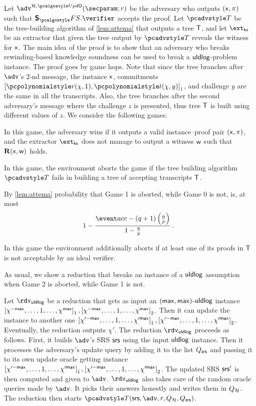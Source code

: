 Let $\adv^{\ro, \initU}(\secparam; r)$ be the adversary who outputs $(\mathsf{x}, \pi)$ such that $\sonicprotfs.\verifier$ accepts the proof. Let $\tdv$ be the tree-building algorithm of \cref{lem:attema} that outputs a tree $\mathsf{T}$, and let $\extcss$ be an extractor that given the tree output by $\tdv$ reveals the witness for $\mathsf{x}$. The main idea of the proof is to show that an adversary who breaks rewinding-based knowledge soundness can be used to break a $\mathsf{uldlog}$-problem instance. The proof goes by game hops. Note that since the tree branches after $\adv$'s $2$-nd message, the instance $\mathsf{x}$, commitments $\gone{\p{r} (\chi, 1), \p{t} (\chi, y)}$, and challenge $y$ are the same in all the transcripts. Also, the tree branches after the second adversary's message where the challenge $z$ is presented, thus tree $\mathsf{T}$ is built using different values of $z$.	We consider the following games.

  In this game, the adversary wins if it outputs a valid instance--proof pair $(\mathsf{x}, \pi)$, and the extractor $\extcss$ does not manage to output a witness $\mathsf{w}$ such that $\mathbf{R} (\mathsf{x}, \mathsf{w})$ holds.

  In this game, the environment aborts the game if the tree building algorithm $\tdv$ fails in building a tree of accepting transcripts $\mathsf{T}$. 

  By \cref{lem:attema} probability that Game 1 is aborted, while Game 0 is not, is, at most
  \[
    1 - \frac{\accProb - (q + 1) \left( \frac{\noofc}{p} \right)} {1 - \frac{\noofc }{p}} \,.
\]

  In this game the environment additionally aborts if at least one of its proofs in $\mathsf{T}$ is not acceptable by an ideal verifier.

  As usual, we show a reduction that breaks an instance of a $\mathsf{uldlog}$ assumption when Game 2 is aborted, while Game 1 is not.

  Let $\rdvuldlog$ be a reduction that gets as input an $(\mathsf{max}, \mathsf{max})$-$\mathsf{uldlog}$ instance $\left[\chi^{-\mathsf{max}}, \ldots, 1, \ldots, \chi^{\mathsf{max}}\right]_{1}, \left[\chi^{-\mathsf{max}}, \ldots, 1, \ldots, \chi^{\mathsf{max}}\right]_{2}$. Then it can update the instance to another one $\left[\chi'^{-\mathsf{max}}, \ldots, 1, \ldots, \chi'^{\mathsf{max}}\right]_{1}, \left[\chi'^{-\mathsf{max}}, \ldots, 1, \ldots, \chi'^{\mathsf{max}}\right]_{2}$. Eventually, the reduction outputs $\chi'$.
	The reduction $\rdvuldlog$ proceeds as follows.
	First, it builds $\adv$'s SRS $\mathsf{srs}$ using the input $\mathsf{uldlog}$ instance. Then it processes the adversary's update query by adding it to the list $Q_{\mathsf{srs}}$ and passing it to its own update oracle getting instance $\left[\chi'^{-\mathsf{max}}, \ldots, 1, \ldots, \chi'^{\mathsf{max}}\right]_{1}, \left[\chi'^{-\mathsf{max}}, \ldots, 1, \ldots, \chi'^{\mathsf{max}}\right]_{2}$. The updated SRS $\mathsf{srs}'$ is then computed and given to $\adv$. $\rdvuldlog$ also takes care of the random oracle queries made by $\adv$. It picks their answers honestly and writes them in $Q_{\mathcal{H}}$. The reduction then starts $\tdv(\srs, \adv, r, \Qro, \Qsrs)$.
	
